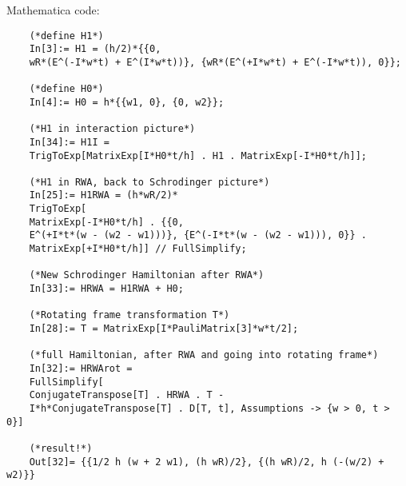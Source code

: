 \documentclass{article}
\theoremstyle{definition}
\begin{document}
\begin{enumerate}[label=\alph*)]
	
	
	Mathematica code:
	\begin{lstlisting}
	(*define H1*)
	In[3]:= H1 = (h/2)*{{0, 
	wR*(E^(-I*w*t) + E^(I*w*t))}, {wR*(E^(+I*w*t) + E^(-I*w*t)), 0}};
	
	(*define H0*)
	In[4]:= H0 = h*{{w1, 0}, {0, w2}};
	
	(*H1 in interaction picture*)
	In[34]:= H1I = 
	TrigToExp[MatrixExp[I*H0*t/h] . H1 . MatrixExp[-I*H0*t/h]];
	
	(*H1 in RWA, back to Schrodinger picture*)
	In[25]:= H1RWA = (h*wR/2)*
	TrigToExp[
	MatrixExp[-I*H0*t/h] . {{0, 
	E^(+I*t*(w - (w2 - w1)))}, {E^(-I*t*(w - (w2 - w1))), 0}} . 
	MatrixExp[+I*H0*t/h]] // FullSimplify;
	
	(*New Schrodinger Hamiltonian after RWA*)
	In[33]:= HRWA = H1RWA + H0;
	
	(*Rotating frame transformation T*)
	In[28]:= T = MatrixExp[I*PauliMatrix[3]*w*t/2];
	
	(*full Hamiltonian, after RWA and going into rotating frame*)
	In[32]:= HRWArot = 
	FullSimplify[
	ConjugateTranspose[T] . HRWA . T - 
	I*h*ConjugateTranspose[T] . D[T, t], Assumptions -> {w > 0, t > 0}]
	
	(*result!*)
	Out[32]= {{1/2 h (w + 2 w1), (h wR)/2}, {(h wR)/2, h (-(w/2) + w2)}}
	\end{lstlisting}
	
	
	
	
	
	
	
	
	

\end{enumerate}
\end{document}
